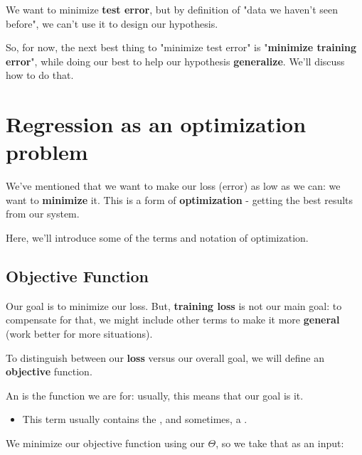         
        We want to minimize \textbf{test error}, but by definition of "data we haven't seen before", we can't use it to design our hypothesis.
        
        So, for now, the next best thing to "minimize test error" is "\textbf{minimize training error}", while doing our best to help our hypothesis \textbf{generalize}. We'll discuss how to do that.

\pagebreak

\section{Regression as an optimization problem}
    
    We've mentioned that we want to make our loss (error) as low as we can: we want to \textbf{minimize} it. This is a form of \textbf{optimization} - getting the best results from our system.
    
    Here, we'll introduce some of the terms and notation of optimization.
    
    \subsection{Objective Function}
    
        Our goal is to minimize our loss. But, \textbf{training loss} is not our main goal: to compensate for that, we might include other terms to make it more \textbf{general} (work better for more situations).
        
        
        To distinguish between our \textbf{loss} versus our overall goal, we will define an \textbf{objective} function.\\
        
        \begin{definition}
            An  is the function we are  for: usually, this means that our goal is  it.

            \begin{itemize}
                \item This term usually contains the , and sometimes, a .
            \end{itemize}
            
            We minimize our objective function using our  $\Theta$, so we take that as an input: 
        \end{definition}
        
